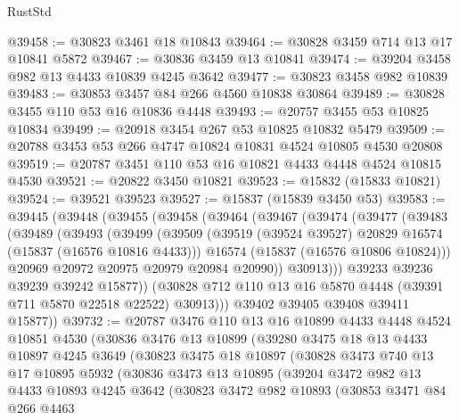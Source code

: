 \begin{lexlean}{RustStd}
\begin{coremodule}
{\begin{coremodule}
{{{{{{{{{{{{{{{{{{{{{{{{{{{{{{{{{{{{{{{{{{{{{{{{{{{{{{{{{{{{@39458 := @30823 @3461 @18 @10843
@39464 := @30828 @3459 @714 @13 @17 @10841 @5872
@39467 := @30836 @3459 @13 @10841
@39474 := @39204 @3458 @982 @13 @4433 @10839 @4245 @3642
@39477 := @30823 @3458 @982 @10839
@39483 := @30853 @3457 @84 @266 @4560 @10838 @30864
@39489 := @30828 @3455 @110 @53 @16 @10836 @4448
@39493 := @20757 @3455 @53 @10825 @10834
@39499 := @20918 @3454 @267 @53 @10825 @10832 @5479
@39509 := @20788 @3453 @53 @266 @4747 @10824 @10831 @4524 @10805 @4530 @20808
@39519 := @20787 @3451 @110 @53 @16 @10821 @4433 @4448 @4524 @10815 @4530
@39521 := @20822 @3450 @10821
@39523 := @15832 (@15833 @10821)
@39524 := @39521 @39523
@39527 := @15837 (@15839 @3450 @53)
@39583 := @39445
    (@39448
      (@39455
        (@39458
          (@39464
            (@39467
              (@39474
                (@39477
                  (@39483
                    (@39489
                      (@39493
                        (@39499
                          (@39509
                            (@39519 (@39524 @39527) @20829 @16574 (@15837 (@16576 @10816 @4433)))
                            @16574
                            (@15837 (@16576 @10806 @10824)))
                          @20969
                          @20972
                          @20975
                          @20979
                          @20984
                          @20990))
                      @30913)))
                @39233
                @39236
                @39239
                @39242
                @15877))
            (@30828 @712 @110 @13 @16 @5870 @4448 (@39391 @711 @5870 @22518 @22522) @30913)))
        @39402
        @39405
        @39408
        @39411
        @15877))
@39732 := @20787
    @3476
    @110
    @13
    @16
    @10899
    @4433
    @4448
    @4524
    @10851
    @4530
    (@30836
      @3476
      @13
      @10899
      (@39280
        @3475
        @18
        @13
        @4433
        @10897
        @4245
        @3649
        (@30823
          @3475
          @18
          @10897
          (@30828
            @3473
            @740
            @13
            @17
            @10895
            @5932
            (@30836
              @3473
              @13
              @10895
              (@39204
                @3472
                @982
                @13
                @4433
                @10893
                @4245
                @3642
                (@30823
                  @3472
                  @982
                  @10893
                  (@30853
                    @3471
                    @84
                    @266
                    @4463
}}}}}}}}}}}}}}}}}}}}}}}}}}}}}}}}}}}}}}}}}}}}}}}}}}}}}}}}}}}}
\end{coremodule}}
\end{coremodule}
\end{lexlean}
